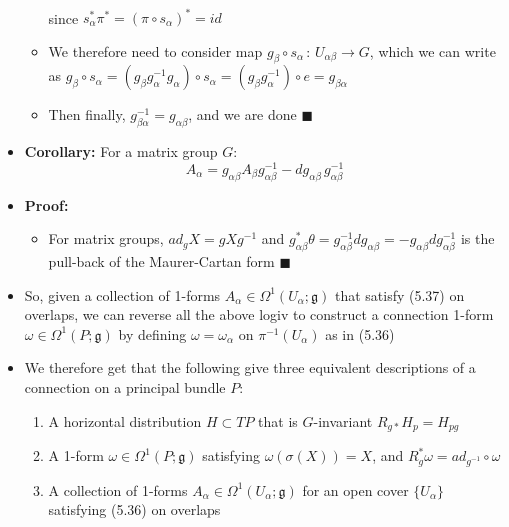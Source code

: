 \documentclass[12pt,a4paper]{article}
\numberwithin{equation}{section}
\begin{document}
\begin{itemize}
\begin{itemize}
$$\begin{aligned}
			\end{aligned}
			$$
			since $s_{\alpha}^{*}\pi^{*}=(\pi\circ s_{\alpha})^{*}=id$
			\item We therefore need to consider map $g_{\beta}\circ s_{\alpha}\,:\,U_{\alpha\beta}\to G$, which we can write as $g_{\beta}\circ s_{\alpha}=(g_{\beta}g_{\alpha}^{-1}g_{\alpha})\circ s_{\alpha}=(g_{\beta}g_{\alpha}^{-1})\circ e=g_{\beta\alpha}$
			\item Then finally, $g_{\beta\alpha}^{-1}=g_{\alpha\beta}$, and we are done $\blacksquare$
		\end{itemize}
		\item \textbf{Corollary:} For a matrix group $G$:
		\begin{equation}
			A_{\alpha}=g_{\alpha\beta}A_{\beta}g_{\alpha\beta}^{-1}-dg_{\alpha\beta}\,g_{\alpha\beta}^{-1}
		\end{equation}
		\item \textbf{Proof:} 
		\begin{itemize} 
			\item For matrix groups, $ad_{g}X=gXg^{-1}$ and $g_{\alpha\beta}^{*}\theta=g^{-1}_{\alpha\beta}dg_{\alpha\beta}=-g_{\alpha\beta}dg_{\alpha\beta}^{-1}$ is the pull-back of the Maurer-Cartan form $\blacksquare$
		\end{itemize}
		\item So, given a collection of 1-forms $A_{\alpha}\in\Omega^{1}(U_{\alpha};\mathfrak{g})$ that satisfy (5.37) on overlaps, we can reverse all the above logiv to construct a connection 1-form $\omega\in\Omega^{1}(P;\mathfrak{g})$ by defining $\omega=\omega_{\alpha}$ on $\pi^{-1}(U_{\alpha})$ as in (5.36)
		\item We therefore get that the following give three equivalent descriptions of a connection on a principal bundle $P$:
		\begin{enumerate}
			\item A horizontal distribution $H\subset TP$ that is $G$-invariant $R_{g*}H_{p}=H_{pg}$
			\item A 1-form $\omega\in\Omega^{1}(P;\mathfrak{g})$ satisfying $\omega(\sigma(X))=X$, and $R_{g}^{*}\omega=ad_{g^{-1}}\circ \omega$
			\item A collection of 1-forms $A_{\alpha}\in\Omega^{1}(U_{\alpha};\mathfrak{g})$ for an open cover $\{U_{\alpha}\}$ satisfying (5.36) on overlaps
		\end{enumerate}
	\end{itemize}
\end{document}

